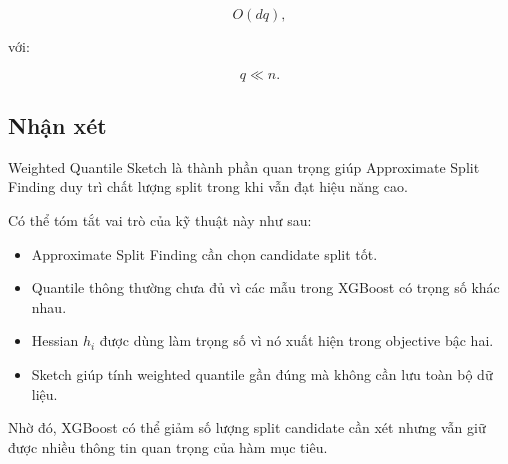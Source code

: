 \[
O(dq),
\]

với:

\[
q \ll n.
\]

\subsection{Nhận xét}

Weighted Quantile Sketch là thành phần quan trọng giúp Approximate Split Finding duy trì chất lượng split trong khi vẫn đạt hiệu năng cao.

Có thể tóm tắt vai trò của kỹ thuật này như sau:

\begin{itemize}
    \item Approximate Split Finding cần chọn candidate split tốt.
    \item Quantile thông thường chưa đủ vì các mẫu trong XGBoost có trọng số khác nhau.
    \item Hessian $h_i$ được dùng làm trọng số vì nó xuất hiện trong objective bậc hai.
    \item Sketch giúp tính weighted quantile gần đúng mà không cần lưu toàn bộ dữ liệu.
\end{itemize}

Nhờ đó, XGBoost có thể giảm số lượng split candidate cần xét nhưng vẫn giữ được nhiều thông tin quan trọng của hàm mục tiêu.

